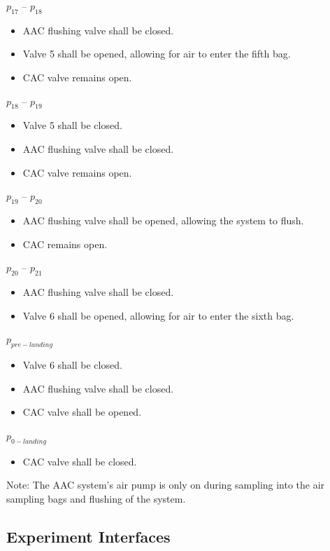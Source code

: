 \documentclass[a4paper,12pt,twoside]{article}
\begin{document}
$p_{17}$ – $p_{18}$
\begin{itemize}
    \item AAC flushing valve shall be closed.
    \item Valve 5 shall be opened, allowing for air to enter the fifth bag. 
    \item CAC valve remains open.
\end{itemize}

$p_{18}$ – $p_{19}$
\begin{itemize}
    \item Valve 5 shall be closed.
    \item AAC flushing valve shall be closed.
    \item CAC valve remains open.
\end{itemize}

$p_{19}$ – $p_{20}$
\begin{itemize}
     \item AAC flushing valve shall be opened, allowing the system to flush. 
    \item CAC remains open.
   \end{itemize}

$p_{20}$ – $p_{21}$
\begin{itemize}
    \item AAC flushing valve shall be closed.
    \item Valve 6 shall be opened, allowing for air to enter the sixth bag.
\end{itemize}

$p_{pre-landing}$ 
\begin{itemize}
    \item Valve 6 shall be closed.
    \item AAC flushing valve shall be closed.
    \item CAC valve shall be opened.
\end{itemize}

$p_{0-landing}$
\begin{itemize}
    \item CAC valve shall be closed.
\end{itemize}


Note: The AAC system's air pump is only on during sampling into the air sampling bags and flushing of the system.


\raggedbottom
\pagebreak
\subsection{Experiment Interfaces}
\end{document}
